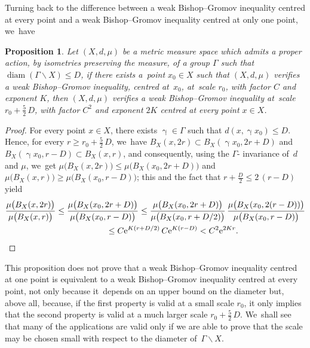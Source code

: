 \documentclass[10pt,a4paper]{amsart}
\numberwithin{equation}{section}
\newtheorem{prop}[theor]{Proposition}
\newcommand{\diam}{\operatorname{diam}}
\newcommand{\g}{\operatorname{\gamma}}
\begin{document}
Turning back to the difference between a weak Bishop--Gromov inequality centred at every point and a weak Bishop--Gromov inequality centred at only one point, we~have

\begin{prop}%
Let $(X, d, \mu)$ be a metric measure space which admits a proper action,
by isometries preserving the measure, of a group $\Gamma$ such that
$\diam (\Gamma \backslash X) \le D$, if there exists a~point $x_0 \in X$ such that $(X, d, \mu)$ verifies a weak Bishop--Gromov inequality, centred
at~$x_0$, at~scale $r_0$, with factor $C$ and exponent $K$, then $(X, d, \mu)$ verifies a weak Bishop--Gromov inequality at~scale $r_0 + \frac{5}{2}\,
D$, with factor $C^2$ and exponent $2 K$ centred at every point $x \in X$.
\end{prop}

\begin{proof} For every point $x \in X$, there exists $\g \in \Gamma$ such that $d(x, \g x_0) \le D$. Hence, for every $r \ge r_0 + \frac{5}{2}\, D$, we~have
$B_X(x,2 r) \subset B_X(\g x_0, 2 r + D)$ and $ B_X(\g x_0, r - D) \subset B_X(x, r)$, and consequently, using the $\Gamma$- invariance of~$d$ and $\mu$, we~get $\mu \big( B_X(x, 2 r)\big) \le \mu \big( B_X( x_0, 2 r + D)\big)$
and $\mu \big( B_X(x, r)\big) \ge \mu \big( B_X( x_0, r - D)\big)$; this
and the fact
that $ r + \frac{D}{2} \le 2\, (r -D)$ yield
\begin{gather*}
\dfrac{\mu \big( B_X(x, 2 r)\big)}{\mu \big( B_X(x,r)\big)} \le \dfrac{\mu \big( B_X( x_0, 2 r + D)\big)}{\mu \big( B_X( x_0, r- D)\big)} \leq
\dfrac{\mu \big( B_X( x_0, 2 r + D)\big)}{\mu \big( B_X( x_0, r+ D/2)\big)} \, \dfrac{\mu \big( B_X( x_0, 2 (r - D))\big)}{\mu \big( B_X( x_0,r- D)\big)}
\\ \hphantom{\dfrac{\mu \big( B_X(x, 2 r)\big)}{\mu \big( B_X(x,r)\big)}}
{}\le C {\rm e}^{K ( r+ D/2)}\, C {\rm e}^{K ( r-D)} < C^2 {\rm e}^{2 K r}.
\tag*{\qed}
\end{gather*}
\renewcommand{\qed}{}
\end{proof}



This proposition does not prove that a weak Bishop--Gromov inequality centred at one point is equivalent to a weak Bishop--Gromov inequality centred
at
every point, not only because it~depends on an upper bound on the diameter but, above all, because, if the first property is valid at a small scale $r_0$, it
only implies that the second property is valid at a much larger scale $r_0 + \frac{5}{2}\, D$. We~shall see that many
of the applications are valid only if we are able to prove that the scale
may be chosen small with respect to the diameter of~$\Gamma \backslash X$.
\end{document}
